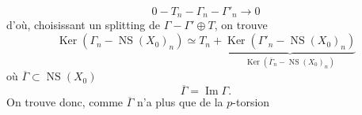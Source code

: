 \[
0\mathbin{-}T_n\mathbin{-}\Gamma_n\mathbin{-}\Gamma'_n\longrightarrow0
\]
d'où, choisissant un splitting de $\Gamma\mathbin{-}\Gamma'\oplus T$, on trouve
\[
\operatorname{Ker}(\Gamma_n\mathbin{-}\operatorname{NS}(X_0)_n)\simeq T_n+\underbrace{\operatorname{Ker}(\Gamma'_n\mathbin{-}\operatorname{NS}(X_0)_n)}_{\operatorname{Ker}(\overline\Gamma_n\mathbin{-}\operatorname{NS}(X_0)_n)}
\]
où $\overline\Gamma\subset\operatorname{NS}(X_0)$
\[
\overline\Gamma=\operatorname{Im}\Gamma.
\]
On trouve donc, comme $\overline\Gamma$ n'a plus que de la $p$-torsion
